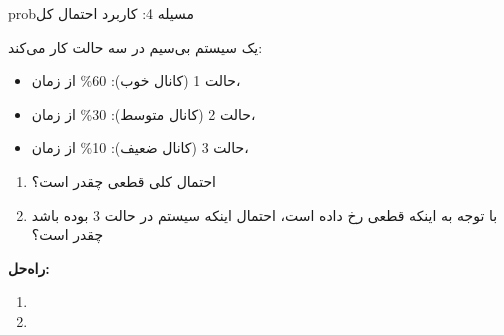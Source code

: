 \begin{PSbox}[unbreakable]{prob}{مسیله 4: کاربرد احتمال کل}

یک سیستم بی‌سیم در سه حالت کار می‌کند:

\begin{itemize}
\tightlist
\item
  حالت 1 (کانال خوب): 60\% از زمان، 
\item
  حالت 2 (کانال متوسط): 30\% از زمان، 
\item
  حالت 3 (کانال ضعیف): 10\% از زمان، 
\end{itemize}

\begin{enumerate}
\def\labelenumi{(\PSalph{enumi})}
\tightlist
\item
  احتمال کلی قطعی چقدر است؟
\item
  با توجه به اینکه قطعی رخ داده است، احتمال اینکه سیستم در حالت 3 بوده باشد چقدر است؟
\end{enumerate}

\textbf{راه‌حل:}

\begin{enumerate}
\def\labelenumi{(\PSalph{enumi})}
\item
\item
\end{enumerate}

\end{PSbox}

